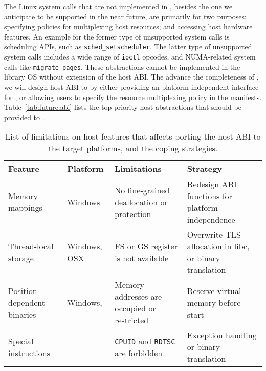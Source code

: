 The Linux system calls that are not implemented in \graphene{},
besides the one we anticipate to be supported in the near future,
are primarily for two purposes:
specifying policies for multiplexing host resources;
and accessing host hardware features.
An example for the former type of unsupported system calls is scheduling APIs, such as {\tt sched\_setscheduler}.
The latter type of unsupported system calls includes
a wide range of {\tt ioctl} opcodes,
and NUMA-related system calls like {\tt migrate\_pages}.
These abstractions cannot be implemented in the library OS
without extension of the host ABI.
The advance the completeness of \graphene{},
we will design host ABI to by
either providing an platform-independent interface
for \picoprocs{},
or allowing users to specify the resource multiplexing policy in the manifests.
Table~\ref{tab:future:abi} lists the top-priority host abstractions
that should be provided to \picoprocs{}.


\begin{table}[t]
\footnotesize
\centering
\begin{tabular}{|p{1.2in}|>{\raggedright\arraybackslash}p{0.8in}|>{\raggedright\arraybackslash}p{1.6in}|>{\raggedright\arraybackslash}p{2.2in}|}
\hline
{\bf Feature} & {\bf Platform} & {\bf Limitations} & {\bf Strategy} \\
\hline
Memory mappings & Windows & No fine-grained deallocation or protection & Redesign ABI functions for platform independence \\
\hline
Thread-local storage & Windows, OSX & FS or GS register is not available & Overwrite TLS allocation in libc, or binary translation \\
\hline
Position-dependent binaries & Windows, \intel{} \sgx{} & Memory addresses are occupied or restricted & Reserve virtual memory before \picoprocs{} start \\
\hline
Special instructions & \intel{} \sgx{} & {\tt CPUID} and {\tt RDTSC} are forbidden & Exception handling or binary translation \\
\hline
\end{tabular}
\caption[List of platform limitations affecting host ABI porting]
{List of limitations on host features that affects porting the host ABI to the target platforms,
and the coping strategies.}
\label{tab:future:abi-limit}
\end{table}

